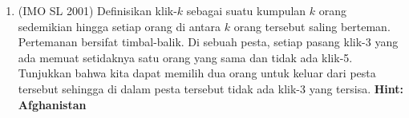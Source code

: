 \documentclass[11pt]{scrartcl}
\begin{document}
\begin{enumerate}
    \item (IMO SL 2001) Definisikan klik-$k$ sebagai suatu kumpulan $k$ orang sedemikian hingga setiap orang di antara $k$ orang tersebut saling berteman. Pertemanan bersifat timbal-balik. Di sebuah pesta, setiap pasang klik-3 yang ada memuat setidaknya satu orang yang sama dan tidak ada klik-5. Tunjukkan bahwa kita dapat memilih dua orang untuk keluar dari pesta tersebut sehingga di dalam pesta tersebut tidak ada klik-3 yang tersisa. \textbf{Hint: Afghanistan}
\end{enumerate}

\newpage
\end{document}
